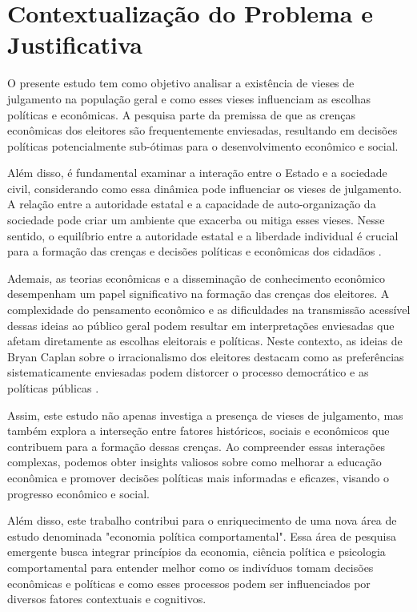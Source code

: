 \section{Contextualização do Problema e Justificativa}

O presente estudo tem como objetivo analisar a existência de vieses de julgamento na população geral e como esses vieses influenciam as escolhas políticas e econômicas. A pesquisa parte da premissa de que as crenças econômicas dos eleitores são frequentemente enviesadas, resultando em decisões políticas potencialmente sub-ótimas para o desenvolvimento econômico e social.

Além disso, é fundamental examinar a interação entre o Estado e a sociedade civil, considerando como essa dinâmica pode influenciar os vieses de julgamento. A relação entre a autoridade estatal e a capacidade de auto-organização da sociedade pode criar um ambiente que exacerba ou mitiga esses vieses. Nesse sentido, o equilíbrio entre a autoridade estatal e a liberdade individual é crucial para a formação das crenças e decisões políticas e econômicas dos cidadãos \cite{acemoglu2019narrow}.

Ademais, as teorias econômicas e a disseminação de conhecimento econômico desempenham um papel significativo na formação das crenças dos eleitores. A complexidade do pensamento econômico e as dificuldades na transmissão acessível dessas ideias ao público geral podem resultar em interpretações enviesadas que afetam diretamente as escolhas eleitorais e políticas. Neste contexto, as ideias de Bryan Caplan sobre o irracionalismo dos eleitores destacam como as preferências sistematicamente enviesadas podem distorcer o processo democrático e as políticas públicas \cite{The_Myth_of_the_Rational_Voter}.

Assim, este estudo não apenas investiga a presença de vieses de julgamento, mas também explora a interseção entre fatores históricos, sociais e econômicos que contribuem para a formação dessas crenças. Ao compreender essas interações complexas, podemos obter insights valiosos sobre como melhorar a educação econômica e promover decisões políticas mais informadas e eficazes, visando o progresso econômico e social.

Além disso, este trabalho contribui para o enriquecimento de uma nova área de estudo denominada "economia política comportamental". Essa área de pesquisa emergente busca integrar princípios da economia, ciência política e psicologia comportamental para entender melhor como os indivíduos tomam decisões econômicas e políticas e como esses processos podem ser influenciados por diversos fatores contextuais e cognitivos.

